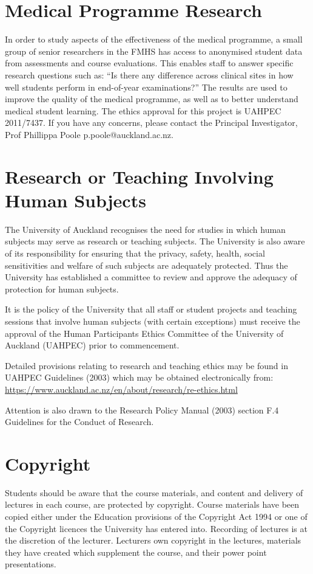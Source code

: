\documentclass[11pt,fleqn]{book} %
\begin{document}
\section{Medical Programme Research}

In order to study aspects of the effectiveness of the medical programme, a small group of senior researchers in the FMHS has access to anonymised student data from assessments and course evaluations. This enables staff to answer specific research questions such as: ``Is there any difference across clinical sites in how well students perform in end-of-year examinations?'' The results are used to improve the quality of the medical programme, as well as to better understand medical student learning. 
The ethics approval for this project is UAHPEC 2011/7437. If you have any concerns, please contact the Principal Investigator, Prof Phillippa Poole p.poole@auckland.ac.nz. 


\section{Research or Teaching Involving Human Subjects}
The University of Auckland recognises the need for studies in which human subjects may serve as research or teaching subjects.  The University is also aware of its responsibility for ensuring that the privacy, safety, health, social sensitivities and welfare of such subjects are adequately protected.  Thus the University has established a committee to review and approve the adequacy of protection for human subjects.  \begin{remark}It is the policy of the University that all staff or student projects and teaching sessions that involve human subjects (with certain exceptions) must receive the approval of the Human Participants Ethics Committee of the University of Auckland (UAHPEC) prior to commencement. \end{remark} 

Detailed provisions relating to research and teaching ethics may be found in UAHPEC Guidelines (2003) which may be obtained electronically from:
\url{https://www.auckland.ac.nz/en/about/research/re-ethics.html}

Attention is also drawn to the Research Policy Manual (2003) section F.4 Guidelines for the Conduct of Research.


\section{Copyright}
Students should be aware that the course materials, and content and delivery of lectures in each course, are protected by copyright. Course materials have been copied either under the Education provisions of the Copyright Act 1994 or one of the Copyright licences the University has entered into. Recording of lectures is at the discretion of the lecturer. Lecturers own copyright in the lectures, materials they have created which supplement the course, and their power point presentations.
\end{document}
